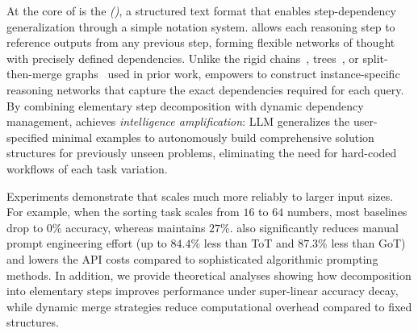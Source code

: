 At the core of \method is the \textit{\scriptfull (\script)}, a structured text format that enables step-dependency generalization through a simple notation system. \script allows each reasoning step to reference outputs from any previous step, forming flexible networks of thought with precisely defined dependencies. Unlike the rigid chains~\citep{wei2022chain}, trees~\citep{yao2024tree}, or split-then-merge graphs~\citep{besta2024graph} used in prior work, \script empowers \method to construct instance-specific reasoning networks that capture the exact dependencies required for each query. By combining elementary step decomposition with dynamic dependency management, \method achieves \textit{intelligence amplification}: LLM generalizes the user-specified minimal examples to autonomously build comprehensive solution structures for previously unseen problems, eliminating the need for hard-coded workflows of each task variation.

Experiments demonstrate that \method scales much more reliably to larger input sizes. For example, when the sorting task scales from $16$ to $64$ numbers, most baselines drop to $0\%$ accuracy, whereas \method maintains $27\%$. \method also significantly reduces manual prompt engineering effort (up to $84.4\%$ less than ToT and $87.3\%$ less than GoT) and lowers the API costs compared to sophisticated algorithmic prompting methods. In addition, we provide theoretical analyses showing how decomposition into elementary steps improves performance under super-linear accuracy decay, while dynamic merge strategies reduce computational overhead compared to fixed structures. 




